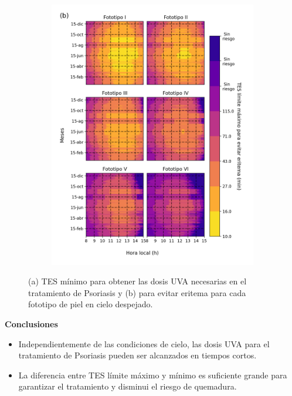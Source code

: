\documentclass{article}
\begin{document}
\begin{multicols}{2}
\begin{figure}[H]
\begin{subfigure}[H]{0.4\linewidth}
        \includegraphics[scale=0.38]{images/ery.png}
    \end{subfigure}
\caption{(a) TES mínimo para obtener las dosis UVA necesarias en el tratamiento de Psoriasis y 
(b) para evitar eritema para cada fototipo de piel en cielo despejado.}
\end{figure}
\changefontsizes{12pt}
\begin{center}
\begin{shaded}
\changefontsizes{12pt}
\textbf{\textcolor{na}{Conclusiones}}
\end{shaded}
\end{center}
\begin{itemize}
    \item Independientemente de las condiciones de cielo, las dosis UVA para el tratamiento de Psoriasis pueden ser alcanzados en tiempos cortos.
    \item La diferencia entre TES límite máximo y mínimo es suficiente grande para garantizar el tratamiento y disminui el riesgo de quemadura.

\end{itemize}
\end{multicols}
\end{document}
